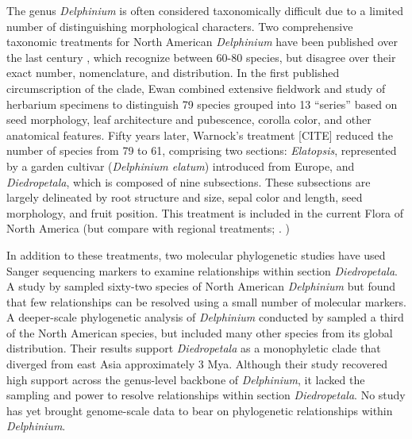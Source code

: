 \documentclass[11pt]{article}
\begin{document}
The genus \emph{Delphinium} is often considered taxonomically difficult due to a 
limited number of 
distinguishing
morphological characters. Two comprehensive 
taxonomic treatments for North American \emph{Delphinium} have been published over 
the last century \citep{benson_synopsis_1946,ewan_1945, warnock_1997}, %
which recognize between 60-80 species, but disagree over their exact number, 
nomenclature, and distribution. 
% 
In the first published circumscription of the clade, Ewan combined extensive 
fieldwork and study of herbarium specimens to distinguish 79 species grouped 
into 13 “series” based on seed morphology, leaf architecture and pubescence, 
corolla color, and other anatomical features. 
% 
Fifty years later, Warnock’s treatment [CITE] reduced the number of species 
from 79 to 61, comprising two sections: \emph{Elatopsis}, represented by a garden 
cultivar (\emph{Delphinium elatum}) introduced from Europe, and 
\emph{Diedropetala}, which is composed of nine subsections.
%
These subsections are largely delineated by root structure and size, 
sepal color and length, seed morphology, and fruit position.
% 
This treatment is included in the current Flora of North America 
\citep{...} (but compare with regional treatments;
\cite{ackerfield_flora_2022,chambers_comments_2018,holmgren_2012,koontz_2012}.
)


In addition to these treatments, two molecular phylogenetic studies have used
Sanger sequencing markers to examine relationships within section \emph{Diedropetala}.
% 
A study by \citet{koontz_using_2004} sampled sixty-two species of 
North American \emph{Delphinium} but found that few relationships can
be resolved using a small number of molecular markers. 
% 
A deeper-scale phylogenetic analysis of \emph{Delphinium} conducted
by \cite{jabbour_phylogeny_2012} sampled a third of the North American species,
but included many other species from its global distribution.
Their results support \emph{Diedropetala} as a monophyletic clade that diverged
from east Asia approximately 3 Mya. 
% 
Although their study recovered high support across the genus-level 
backbone of \emph{Delphinium}, it lacked the sampling and power to 
resolve relationships within section \emph{Diedropetala}.
% 
No study has yet brought genome-scale data to bear on phylogenetic 
relationships within \emph{Delphinium}.
\end{document}
